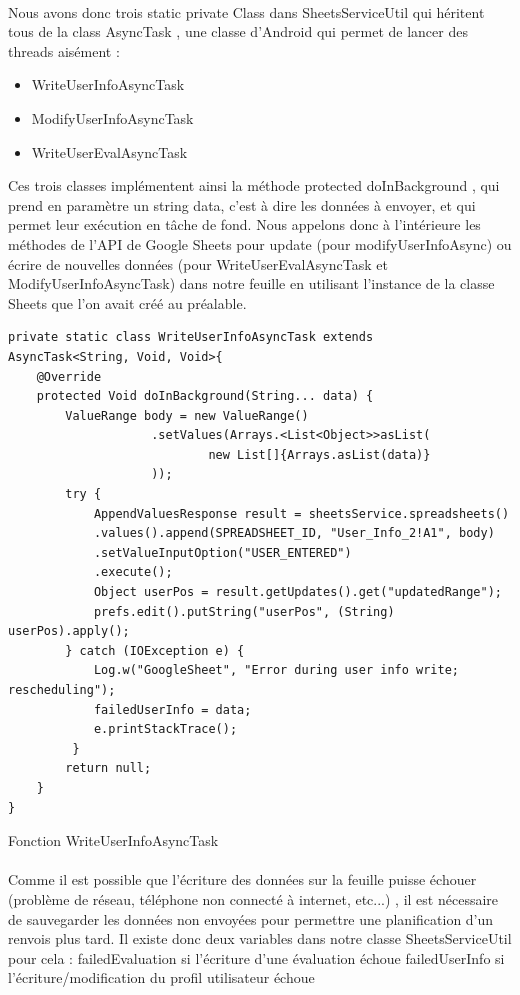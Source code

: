 \documentclass[a4paper, 10pt]{article}
\begin{document}
\paragraph{}
Nous avons donc trois static private Class dans SheetsServiceUtil qui héritent tous de la class AsyncTask , une classe d’Android qui permet de lancer des threads aisément : 
 \begin{itemize}
\item WriteUserInfoAsyncTask
\item ModifyUserInfoAsyncTask
\item WriteUserEvalAsyncTask
\end{itemize}
Ces trois classes implémentent ainsi la méthode protected doInBackground , qui prend en paramètre un string data, c’est à dire les données à envoyer, et qui permet leur exécution en tâche de fond.
Nous appelons donc à l'intérieure les méthodes de l’API de Google Sheets pour update (pour modifyUserInfoAsync) 
ou écrire de nouvelles données (pour WriteUserEvalAsyncTask et ModifyUserInfoAsyncTask) dans notre feuille en utilisant l’instance de la classe Sheets que l’on avait créé au préalable.
\hfill \break 
\begin{lstlisting}[tabsize=3]
private static class WriteUserInfoAsyncTask extends 
AsyncTask<String, Void, Void>{
	@Override
	protected Void doInBackground(String... data) {
		ValueRange body = new ValueRange()
                    .setValues(Arrays.<List<Object>>asList(
                            new List[]{Arrays.asList(data)}
                    ));
		try {
			AppendValuesResponse result = sheetsService.spreadsheets()
			.values().append(SPREADSHEET_ID, "User_Info_2!A1", body)
			.setValueInputOption("USER_ENTERED")
			.execute();
			Object userPos = result.getUpdates().get("updatedRange");
			prefs.edit().putString("userPos", (String) userPos).apply();
		} catch (IOException e) {
			Log.w("GoogleSheet", "Error during user info write; rescheduling");
			failedUserInfo = data;
			e.printStackTrace();
		 }
		return null;
	}
}
\end{lstlisting}
Fonction WriteUserInfoAsyncTask
\paragraph{}
Comme il est possible que l’écriture des données sur la feuille puisse échouer (problème de réseau, téléphone non connecté à internet, etc...) , il est nécessaire de sauvegarder les données non envoyées pour permettre une planification d’un renvois plus tard. Il existe donc deux variables dans notre classe SheetsServiceUtil pour cela : 
failedEvaluation si l’écriture d’une évaluation échoue
failedUserInfo si l’écriture/modification du profil utilisateur échoue
\end{document}
